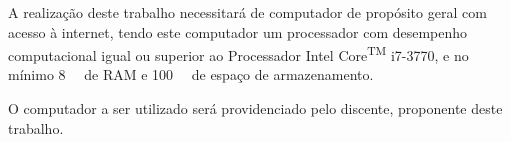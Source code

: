 A realização deste trabalho necessitará de computador de propósito geral com acesso à internet, tendo este computador um processador com desempenho computacional igual ou superior ao Processador Intel\textsuperscript{\textregistered} Core\textsuperscript{TM} i7-3770, e no mínimo \SI{8}{\giga\byte} de RAM e \SI{100}{\giga\byte} de espaço de armazenamento.

O computador a ser utilizado será providenciado pelo discente, proponente deste trabalho.
